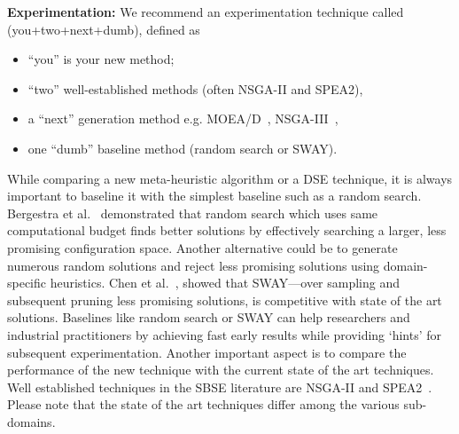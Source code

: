 \documentclass[sigconf,anonymous,review]{acmart}
\newcommand\TODO[1]{\textcolor{ScarletRed}{\textbf{\colorbox{yellow}{\small TODO:}} \emph{#1}}\xspace}
\begin{document}

 \noindent\textbf{Experimentation: } We recommend an experimentation technique called (you+two+next+dumb),  defined as 
\begin{itemize}[leftmargin=*]
\item ``you'' is your new method;
    \item ``two''  well-established methods (often NSGA-II and SPEA2),
    \item a ``next''  generation method e.g. MOEA/D~\cite{zhang2007moea}, NSGA-III~\cite{deb2014evolutionary},
    \item  one ``dumb'' baseline method (random search or SWAY).
\end{itemize}

While comparing a new meta-heuristic algorithm or a DSE technique, it is always important to baseline it with the simplest baseline such as a random search. Bergestra et al.~\cite{bergstra2012random} demonstrated that random search which uses same computational budget finds better solutions by effectively searching a larger, less promising configuration space. Another alternative could be to generate numerous random solutions and reject less promising solutions using domain-specific heuristics. Chen et al.~\cite{chen2017sampling}, showed that SWAY---over sampling and subsequent pruning less promising solutions, is competitive with state of the art solutions. Baselines like random search or SWAY can help researchers and industrial practitioners by achieving fast early results while providing `hints' for subsequent experimentation.
Another important aspect is to compare the performance of the new technique with the current state of the art techniques. Well established techniques in the SBSE literature are NSGA-II and SPEA2~\cite{chen2017beyond}. Please note that the state of the art techniques differ among the various sub-domains.
\end{document}
